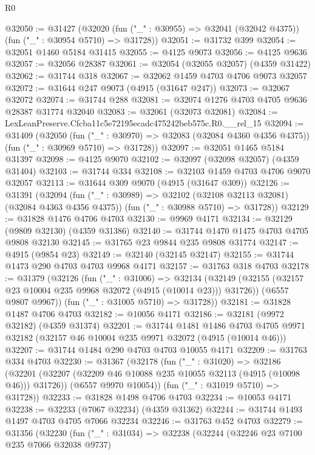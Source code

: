 \begin{lexlean}{R0}
\begin{coremodule}
@32050 := @31427
    (@32020 (fun ("_" : @30955) => @32041 (@32042 @4375)) (fun ("_" : @30954 @5710) => @31728))
@32051 := @31732 @399
@32054 := @32051 @1460 @5184 @31415
@32055 := @4125 @9073
@32056 := @4125 @9636
@32057 := @32056 @28387
@32061 := @32054 (@32055 @32057) (@4359 @31422)
@32062 := @31744 @318
@32067 := @32062 @1459 @4703 @4706 @9073 @32057
@32072 := @31644 @247 @9073 (@4915 (@31647 @247))
@32073 := @32067 @32072
@32074 := @31744 @288
@32081 := @32074 @1276 @4703 @4705 @9636 @28387 @31774 @32040
@32083 := @32061 (@32073 @32081)
@32084 := LexLeanPreserve.Cfcba11c5e72195ecadc475242beb575c.R0.__rel_15
@32094 := @31409
    (@32050
      (fun ("_" : @30970) => @32083 (@32084 @4360 @4356 @4375))
      (fun ("_" : @30969 @5710) => @31728))
@32097 := @32051 @1465 @5184 @31397
@32098 := @4125 @9070
@32102 := @32097 (@32098 @32057) (@4359 @31404)
@32103 := @31744 @334
@32108 := @32103 @1459 @4703 @4706 @9070 @32057
@32113 := @31644 @309 @9070 (@4915 (@31647 @309))
@32126 := @31391
    (@32094
      (fun ("_" : @30989) => @32102 (@32108 @32113 @32081) (@32084 @4363 @4356 @4375))
      (fun ("_" : @30988 @5710) => @31728))
@32129 := @31828 @1476 @4706 @4703
@32130 := @9969 @4171
@32134 := @32129 (@9809 @32130) (@4359 @31386)
@32140 := @31744 @1470 @1475 @4703 @4705 @9808 @32130
@32145 := @31765 @23 @9844 @235 @9808 @31774
@32147 := @4915 (@9854 @23)
@32149 := @32140 (@32145 @32147)
@32155 := @31744 @1473 @290 @4703 @4703 @9968 @4171
@32157 := @31763 @318 @4703
@32178 := @31379
    (@32126
      (fun ("_" : @31006) =>
      @32134
        (@32149 (@32155 (@32157 @23 @10004 @235 @9968 @32072 (@4915 (@10014 @23))) @31726))
        (@6557 @9807 @9967))
      (fun ("_" : @31005 @5710) => @31728))
@32181 := @31828 @1487 @4706 @4703
@32182 := @10056 @4171
@32186 := @32181 (@9972 @32182) (@4359 @31374)
@32201 := @31744
    @1481
    @1486
    @4703
    @4705
    @9971
    @32182
    (@32157 @46 @10004 @235 @9971 @32072 (@4915 (@10014 @46)))
@32207 := @31744 @1484 @290 @4703 @4703 @10055 @4171
@32209 := @31763 @334 @4703
@32230 := @31367
    (@32178
      (fun ("_" : @31020) =>
      @32186
        (@32201 (@32207 (@32209 @46 @10088 @235 @10055 @32113 (@4915 (@10098 @46))) @31726))
        (@6557 @9970 @10054))
      (fun ("_" : @31019 @5710) => @31728))
@32233 := @31828 @1498 @4706 @4703
@32234 := @10053 @4171
@32238 := @32233 (@7067 @32234) (@4359 @31362)
@32244 := @31744 @1493 @1497 @4703 @4705 @7066 @32234
@32246 := @31763 @452 @4703
@32279 := @31356
    (@32230
      (fun ("_" : @31034) =>
      @32238
        (@32244
          (@32246 @23 @7100 @235 @7066 @32038 @9737)

\end{coremodule}
\end{lexlean}
